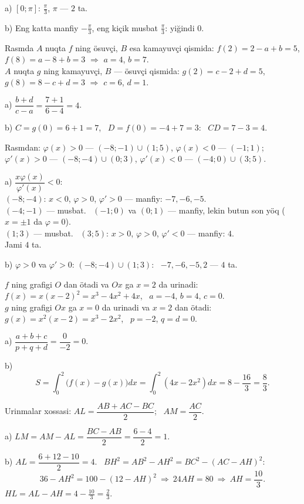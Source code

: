 a) $[0;\pi]$: $\frac\pi3$, $\pi$ — $2$ ta.

b) Eng katta manfiy $-\frac\pi3$, eng kiçik musbat $\frac\pi3$: yiğindi $0$.

\newpage
{}
Rasmda $A$ nuqta $f$ ning ösuvçi, $B$ esa kamayuvçi qismida: $f(2)=2-a+b=5$, $f(8)=a-8+b=3$ $\Rightarrow$ $a=4$, $b=7$.\\
$A$ nuqta $g$ ning kamayuvçi, $B$ — ösuvçi qismida: $g(2)=c-2+d=5$, $g(8)=8-c+d=3$ $\Rightarrow$ $c=6$, $d=1$.

a) $\dfrac{b+d}{c-a}=\dfrac{7+1}{6-4}=4$.

b) $C=g(0)=6+1=7$, \ $D=f(0)=-4+7=3$: \ $CD=7-3=4$.

\newpage
{}
Rasmdan: $\varphi(x)>0$ — $(-8;-1)\cup(1;5)$, $\varphi(x)<0$ — $(-1;1)$; \ $\varphi'(x)>0$ — $(-8;-4)\cup(0;3)$, $\varphi'(x)<0$ — $(-4;0)\cup(3;5)$.

a) $\dfrac{x\varphi(x)}{\varphi'(x)}<0$:\\
$(-8;-4)$: $x<0$, $\varphi>0$, $\varphi'>0$ — manfiy: $-7,-6,-5$.\\
$(-4;-1)$ — musbat. \ $(-1;0)$ va $(0;1)$ — manfiy, lekin butun son yöq ($x=\pm1$ da $\varphi=0$).\\
$(1;3)$ — musbat. \ $(3;5)$: $x>0$, $\varphi>0$, $\varphi'<0$ — manfiy: $4$.\\
Jami $4$ ta.

b) $\varphi>0$ va $\varphi'>0$: $(-8;-4)\cup(1;3)$: \ $-7,-6,-5,2$ — $4$ ta.

\newpage
{}
$f$ ning grafigi $O$ dan ötadi va $Ox$ ga $x=2$ da urinadi: $f(x)=x(x-2)^2=x^3-4x^2+4x$, \ $a=-4$, $b=4$, $c=0$.\\
$g$ ning grafigi $Ox$ ga $x=0$ da urinadi va $x=2$ dan ötadi: $g(x)=x^2(x-2)=x^3-2x^2$, \ $p=-2$, $q=d=0$.

a) $\dfrac{a+b+c}{p+q+d}=\dfrac0{-2}=0$.

b) \[S=\int_0^2\bigl(f(x)-g(x)\bigr)dx=\int_0^2\left(4x-2x^2\right)dx=8-\frac{16}3=\frac83.\]

\newpage
{}
Urinmalar xossasi: $AL=\dfrac{AB+AC-BC}2$; \ $AM=\dfrac{AC}2$.

a) $LM=AM-AL=\dfrac{BC-AB}2=\dfrac{6-4}2=1$.

b) $AL=\dfrac{6+12-10}2=4$. \ $BH^2=AB^2-AH^2=BC^2-(AC-AH)^2$:
\[36-AH^2=100-(12-AH)^2\ \Rightarrow\ 24AH=80\ \Rightarrow\ AH=\frac{10}3.\]
$HL=AL-AH=4-\frac{10}3=\frac23$.


